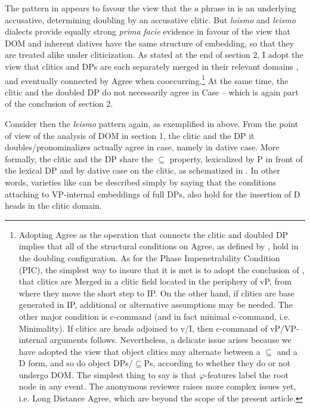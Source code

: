 \documentclass[output=paper,nonflat,modfonts]{langsci/langscibook}
\begin{document}
The pattern in  appears to favour the view that the \textit{a} phrase in  is an underlying accusative, determining doubling by an accusative clitic. But \textit{loismo} and \textit{leismo} dialects provide equally strong \textit{prima} \textit{facie} evidence in favour of the view that DOM and inherent datives have the same structure of embedding, so that they are treated alike under cliticization. As stated at the end of section 2, I adopt the view that clitics and DPs are each separately merged in their relevant domains \citep{Sportiche1996}, and eventually connected by  Agree when cooccurring.\footnote{Adopting Agree as the operation that connects the clitic and doubled DP implies that all of the structural conditions on Agree, as defined by \citet{Chomsky2000}, hold in the doubling configuration. As for the Phase Impenetrability Condition (PIC), the simplest way to insure that it is met is to adopt the conclusion of \citet{Sportiche1996}, that clitics are Merged in a clitic field located in the periphery of vP, from where they move the short step to IP. On the other hand, if clitics are base generated in IP, additional or alternative assumptions may be needed. The other major condition is c-command (and in fact minimal c-command, i.e. Minimality). If clitics are heads adjoined to v/I, then c-command of vP/VP-internal arguments follows. Nevertheless, a delicate issue arises because we have adopted the view that object clitics may alternate between a \textrm{${\subseteq}$} and a D form, and so do object DPs/\textrm{${\subseteq}$}Ps, according to whether they do or not undergo DOM.  The simplest thing to say is that $\varphi $-features label the root node in any event. The anonymous reviewer raises more complex issues yet, i.e. Long Distance Agree, which are beyond the scope of the present article.}\textstyleFootnoteSymbol{} At the same time, the clitic and the doubled DP do not necessarily agree in Case – which is again part of the conclusion of section 2. 

Consider then the \textit{leismo} pattern again, as exemplified in  above. From the point of view of the analysis of DOM in section 1, the clitic and the DP it doubles/pronominalizes actually agree in case, namely in dative case. More formally, the clitic and the DP share the ${\subseteq}$ property, lexicalized by P in front of the lexical DP and by dative case on the clitic, as schematized in . In other words, varieties like  can be described simply by saying that the conditions attaching to VP-internal embeddings of full DPs, also hold for the insertion of D heads in the clitic domain.  
\end{document}
